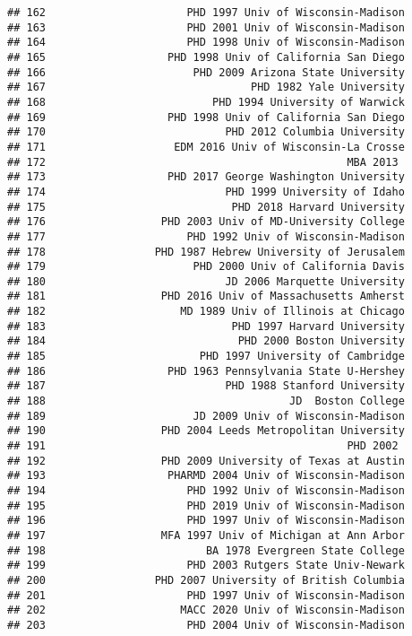 \documentclass[
]{article}
\begin{document}
\begin{verbatim}
## 162                      PHD 1997 Univ of Wisconsin-Madison
## 163                      PHD 2001 Univ of Wisconsin-Madison
## 164                      PHD 1998 Univ of Wisconsin-Madison
## 165                   PHD 1998 Univ of California San Diego
## 166                       PHD 2009 Arizona State University
## 167                                PHD 1982 Yale University
## 168                          PHD 1994 University of Warwick
## 169                   PHD 1998 Univ of California San Diego
## 170                            PHD 2012 Columbia University
## 171                    EDM 2016 Univ of Wisconsin-La Crosse
## 172                                               MBA 2013 
## 173                   PHD 2017 George Washington University
## 174                            PHD 1999 University of Idaho
## 175                             PHD 2018 Harvard University
## 176                  PHD 2003 Univ of MD-University College
## 177                      PHD 1992 Univ of Wisconsin-Madison
## 178                 PHD 1987 Hebrew University of Jerusalem
## 179                       PHD 2000 Univ of California Davis
## 180                            JD 2006 Marquette University
## 181                  PHD 2016 Univ of Massachusetts Amherst
## 182                     MD 1989 Univ of Illinois at Chicago
## 183                             PHD 1997 Harvard University
## 184                              PHD 2000 Boston University
## 185                        PHD 1997 University of Cambridge
## 186                   PHD 1963 Pennsylvania State U-Hershey
## 187                            PHD 1988 Stanford University
## 188                                      JD  Boston College
## 189                       JD 2009 Univ of Wisconsin-Madison
## 190                  PHD 2004 Leeds Metropolitan University
## 191                                               PHD 2002 
## 192                  PHD 2009 University of Texas at Austin
## 193                   PHARMD 2004 Univ of Wisconsin-Madison
## 194                      PHD 1992 Univ of Wisconsin-Madison
## 195                      PHD 2019 Univ of Wisconsin-Madison
## 196                      PHD 1997 Univ of Wisconsin-Madison
## 197                  MFA 1997 Univ of Michigan at Ann Arbor
## 198                         BA 1978 Evergreen State College
## 199                      PHD 2003 Rutgers State Univ-Newark
## 200                 PHD 2007 University of British Columbia
## 201                      PHD 1997 Univ of Wisconsin-Madison
## 202                     MACC 2020 Univ of Wisconsin-Madison
## 203                      PHD 2004 Univ of Wisconsin-Madison

\end{verbatim}
\end{document}
